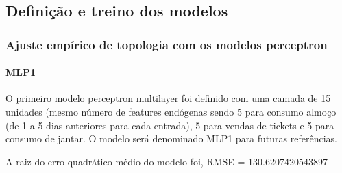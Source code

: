 \documentclass[	12pt, Times, openright, twoside, a4paper, english, brazil]{abntex2}
\begin{document}
    	\subsection{Definição e treino dos modelos}
    	    \subsubsection{Ajuste empírico de topologia com os modelos perceptron}
              \paragraph{MLP1}
    	        O primeiro modelo perceptron multilayer foi definido com uma camada de 15 unidades (mesmo número de features endógenas sendo 5 para consumo almoço (de 1 a 5 dias anteriores para cada entrada), 5 para vendas de tickets e 5 para consumo de jantar.
    	        O modelo será denominado MLP1 para futuras referências.
    	        \begin{figure}[H]
                \end{figure}
                \begin{figure}[H]
                \end{figure}
    	        A raiz do erro quadrático médio do modelo foi, RMSE = 130.6207420543897
    	        
\end{document}
